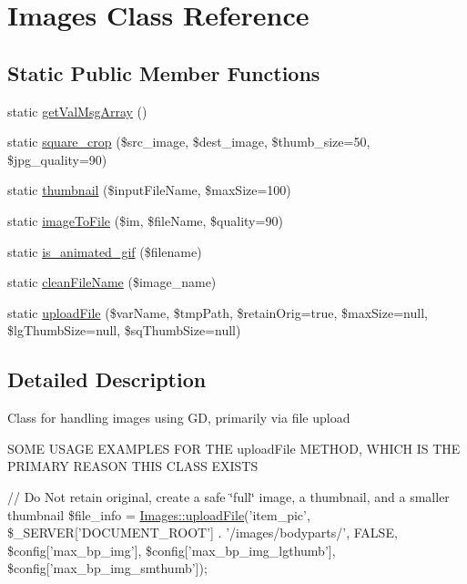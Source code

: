 \hypertarget{class_images}{\section{Images Class Reference}
\label{class_images}
}
\subsection*{Static Public Member Functions}
\begin{DoxyCompactItemize}
\item 
static \hyperlink{class_images_a6acbeecf6d38b6224ca2e69a5014e7ff}{get\-Val\-Msg\-Array} ()
\item 
static \hyperlink{class_images_a883566e1257c9f6f7ea797ba2ce0da06}{square\-\_\-crop} (\$src\-\_\-image, \$dest\-\_\-image, \$thumb\-\_\-size=50, \$jpg\-\_\-quality=90)
\item 
static \hyperlink{class_images_a69aaeb92ffa755b98a4092eb0a255c72}{thumbnail} (\$input\-File\-Name, \$max\-Size=100)
\item 
static \hyperlink{class_images_a187f2de0b924431a2a7b08a4637fbc9a}{image\-To\-File} (\$im, \$file\-Name, \$quality=90)
\item 
static \hyperlink{class_images_a9fd2462b057c4b6bbe052a757addad15}{is\-\_\-animated\-\_\-gif} (\$filename)
\item 
static \hyperlink{class_images_a6e88b713f61d605fefc5feb3dc00ff88}{clean\-File\-Name} (\$image\-\_\-name)
\item 
static \hyperlink{class_images_a9816037394561e5a162c8162168b20d9}{upload\-File} (\$var\-Name, \$tmp\-Path, \$retain\-Orig=true, \$max\-Size=null, \$lg\-Thumb\-Size=null, \$sq\-Thumb\-Size=null)
\end{DoxyCompactItemize}


\subsection{Detailed Description}
Class for handling images using G\-D, primarily via file upload

S\-O\-M\-E U\-S\-A\-G\-E E\-X\-A\-M\-P\-L\-E\-S F\-O\-R T\-H\-E upload\-File M\-E\-T\-H\-O\-D, W\-H\-I\-C\-H I\-S T\-H\-E P\-R\-I\-M\-A\-R\-Y R\-E\-A\-S\-O\-N T\-H\-I\-S C\-L\-A\-S\-S E\-X\-I\-S\-T\-S

// Do Not retain original, create a safe \char`\"{}full\char`\"{} image, a thumbnail, and a smaller thumbnail \$file\-\_\-info = \hyperlink{class_images_a9816037394561e5a162c8162168b20d9}{Images\-::upload\-File}('item\-\_\-pic', \$\-\_\-\-S\-E\-R\-V\-E\-R\mbox{[}'D\-O\-C\-U\-M\-E\-N\-T\-\_\-\-R\-O\-O\-T'\mbox{]} . '/images/bodyparts/', F\-A\-L\-S\-E, \$config\mbox{[}'max\-\_\-bp\-\_\-img'\mbox{]}, \$config\mbox{[}'max\-\_\-bp\-\_\-img\-\_\-lgthumb'\mbox{]}, \$config\mbox{[}'max\-\_\-bp\-\_\-img\-\_\-smthumb'\mbox{]});

